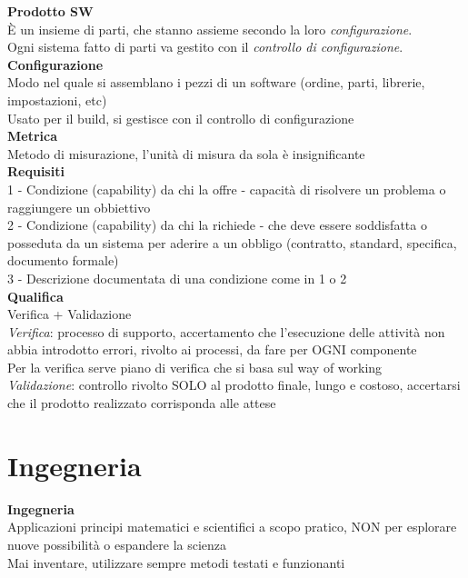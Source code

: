 \documentclass{article}
\begin{document}
		\textbf{Prodotto SW}\\
		È un insieme di parti, che stanno assieme secondo la loro \textit{configurazione}.\\
		Ogni sistema fatto di parti va gestito con il \textit{controllo di configurazione}.\\
			
		\textbf{Configurazione}\\
		Modo nel quale si assemblano i pezzi di un software (ordine, parti, librerie, impostazioni, etc)\\
		Usato per il build, si gestisce con il controllo di configurazione\\
			
		\textbf{Metrica}\\
		Metodo di misurazione, l'unità di misura da sola è insignificante\\
		
		\textbf{Requisiti}\\
		1 - Condizione (capability) da chi la offre - capacità di risolvere un problema o raggiungere un obbiettivo\\
		2 - Condizione (capability) da chi la richiede - che deve essere soddisfatta o posseduta da un sistema per aderire a un obbligo (contratto, standard, specifica, documento formale)\\
		3 - Descrizione documentata di una condizione come in 1 o 2\\
		
		\textbf{Qualifica}\\
		Verifica + Validazione\\
		\textit{Verifica}: processo di supporto, accertamento che l'esecuzione delle attività non abbia introdotto errori, rivolto ai processi, da fare per OGNI componente\\
		Per la verifica serve piano di verifica che si basa sul way of working\\
		\textit{Validazione}: controllo rivolto SOLO al prodotto finale, lungo e costoso, accertarsi che il prodotto realizzato corrisponda alle attese\\
		
		
		
		
		
		
		
		
		
		
		
		
		
		
		
		
		
			
	\clearpage
	\section{Ingegneria}
		\textbf{Ingegneria}\\
			Applicazioni principi matematici e scientifici a scopo pratico, NON per esplorare nuove possibilità o espandere la scienza\\
			Mai inventare, utilizzare sempre metodi testati e funzionanti\\
			
\end{document}
